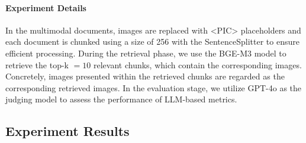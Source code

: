\paragraph{Experiment Details} In the multimodal documents, images are replaced with <PIC> placeholders and each document is chunked using a size of 256 with the SentenceSplitter \citep{Liu_LlamaIndex_2022} to ensure efficient processing. During the retrieval phase, we use the BGE-M3 model \citep{chen2024bge} to retrieve the top-k $= 10$ relevant chunks, which contain the corresponding images. Concretely, images presented within the retrieved chunks are regarded as the corresponding retrieved images. In the evaluation stage, we utilize GPT-4o \citep{gpt4o} as the judging model to assess the performance of LLM-based metrics.
\vspace{-10pt}




\subsection{Experiment Results}

